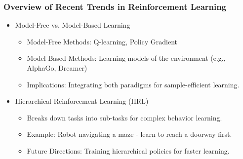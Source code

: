 \documentclass[aspectratio=169]{beamer}
\begin{document}
\begin{frame}[fragile]
    \frametitle{Overview of Recent Trends in Reinforcement Learning}
    \begin{itemize}
        \item Model-Free vs. Model-Based Learning
        \begin{itemize}
            \item Model-Free Methods: Q-learning, Policy Gradient
            \item Model-Based Methods: Learning models of the environment (e.g., AlphaGo, Dreamer)
            \item Implications: Integrating both paradigms for sample-efficient learning.
        \end{itemize}

        \item Hierarchical Reinforcement Learning (HRL)
        \begin{itemize}
            \item Breaks down tasks into sub-tasks for complex behavior learning.
            \item Example: Robot navigating a maze - learn to reach a doorway first.
            \item Future Directions: Training hierarchical policies for faster learning.
        \end{itemize}
    \end{itemize}
\end{frame}
\end{document}
